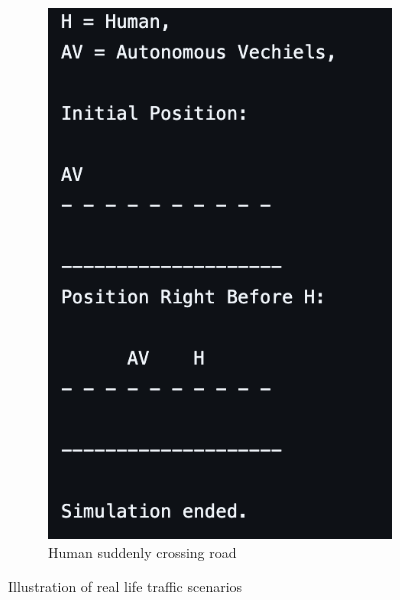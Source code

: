 \documentclass[conference]{IEEEtran}
\begin{document}
\begin{figure}[h]
\begin{subfigure}[b]{0.3\textwidth}
        \includegraphics[width=.9\linewidth]{Fig/Human_reasoning_S3.png}
        \caption{Human suddenly crossing road}
    \end{subfigure}
    \caption{Illustration of real life traffic scenarios}
    \label{fig:llm_outputs}
\end{figure}
\end{document}
